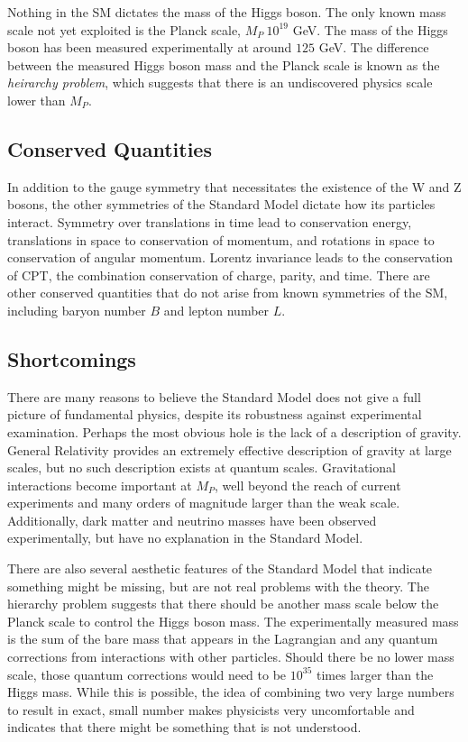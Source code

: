Nothing in the \ac{SM} dictates the mass of the Higgs boson. The only known mass scale not yet exploited is the Planck scale, $M_P ~{} 10^{19}$ GeV. The mass of the Higgs boson has been measured experimentally at around $125$ GeV. The difference between the measured Higgs boson mass and the Planck scale is known as the \emph{heirarchy problem}, which suggests that there is an undiscovered physics scale lower than $M_P$. 


\subsection{Conserved Quantities}

In addition to the gauge symmetry that necessitates the existence of the W and Z bosons, the other symmetries of the Standard Model dictate how its particles interact. Symmetry over translations in time lead to conservation energy, translations in space to conservation of momentum, and rotations in space to conservation of angular momentum. Lorentz invariance leads to the conservation of CPT, the combination conservation of charge, parity, and time. There are other conserved quantities that do not arise from known symmetries of the \ac{SM}, including baryon number $B$ and lepton number $L$. 


\subsection{Shortcomings}
There are many reasons to believe the Standard Model does not give a full picture of fundamental physics, despite its robustness against experimental examination. Perhaps the most obvious hole is the lack of a description of gravity. General Relativity provides an extremely effective description of gravity at large scales, but no such description exists at quantum scales. Gravitational interactions become important at $M_P$, well beyond the reach of current experiments and many orders of magnitude larger than the weak scale. Additionally, dark matter and neutrino masses have been observed experimentally, but have no explanation in the Standard Model. 

There are also several aesthetic features of the Standard Model that indicate something might be missing, but are not real problems with the theory. The hierarchy problem suggests that there should be another mass scale below the Planck scale to control the Higgs boson mass. The experimentally measured mass is the sum of the bare mass that appears in the Lagrangian and any quantum corrections from interactions with other particles. Should there be no lower mass scale, those quantum corrections would need to be $10^{35}$ times larger than the Higgs mass. While this is possible, the idea of combining two very large numbers to result in exact, small number makes physicists very uncomfortable and indicates that there might be something that is not understood.


